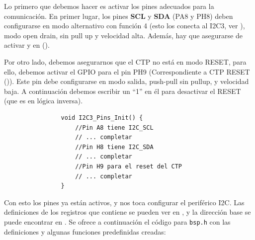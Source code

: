 \documentclass[../main.tex]{subfiles}
\begin{document}
            Lo primero que debemos hacer es activar los pines adecuados para la comunicación. En primer lugar, los pines \textbf{SCL} y \textbf{SDA} (PA8 y PH8) deben configurarse en modo alternativo con función 4 (esto los conecta al I2C3, ver \DSMAN[Table 12]), modo open drain, sin pull up y velocidad alta. Además, hay que asegurarse de activar  y  en  (\REFMAN[5.3.10]).

            Por otro lado, debemos asegurarnos que el CTP no está en modo RESET, para ello, debemos activar el GPIO para el pin PH9 (Correspondiente a CTP RESET ()). Este pin debe configurarse en modo salida, push-pull sin pullup, y velocidad baja. A continuación debemos escribir un ``1'' en él para desactivar el RESET (que es en lógica inversa).

            \begin{lstlisting}
                void I2C3_Pins_Init() {
                    //Pin A8 tiene I2C_SCL
                    // ... completar
                    //Pin H8 tiene I2C_SDA
                    // ... completar
                    //Pin H9 para el reset del CTP
                    // ... completar
                }         
            \end{lstlisting}

            Con esto los pines ya están activos, y nos toca configurar el periférico I2C. Las definiciones de los registros que contiene se pueden ver en \REFMAN[26.9], y la dirección base se puede encontrar en \REFMAN[1.6.2]. Se ofrece a continuación el código para \texttt{bsp.h} con las definiciones y algunas funciones predefinidas creadas:
\end{document}
